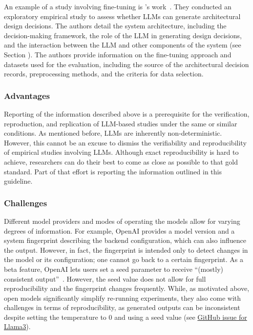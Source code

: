 An example of a study involving fine-tuning is \citeauthor{DBLP:conf/icsa/DharVV24}'s work~\cite{DBLP:conf/icsa/DharVV24}.
They conducted an exploratory empirical study to assess whether LLMs can generate architectural design decisions.
The authors detail the system architecture, including the decision-making framework, the role of the LLM in generating design decisions, and the interaction between the LLM and other components of the system (see Section \toolarchitecture).
The authors provide information on the fine-tuning approach and datasets used for the evaluation, including the source of the architectural decision records, preprocessing methods, and the criteria for data selection. 

\subsubsection{Advantages}

Reporting of the information described above is a prerequisite for the verification, reproduction, and replication of LLM-based studies under the same or similar conditions.
As mentioned before, LLMs are inherently non-deterministic. 
However, this cannot be an excuse to dismiss the verifiability and reproducibility of empirical studies involving LLMs.
Although exact reproducibility is hard to achieve, researchers can do their best to come as close as possible to that gold standard.
Part of that effort is reporting the information outlined in this guideline. 

\subsubsection{Challenges}

Different model providers and modes of operating the models allow for varying degrees of information.
For example, OpenAI provides a model version and a system fingerprint describing the backend configuration, which can also influence the output.
However, in fact, the fingerprint is intended only to detect changes in the model or its configuration; one cannot go back to a certain fingerprint.
As a beta feature, OpenAI lets users set a seed parameter to receive ``(mostly) consistent output''~\cite{OpenAI23}.
However, the seed value does not allow for full reproducibility and the fingerprint changes frequently. 
While, as motivated above, open models significantly simplify re-running experiments, they also come with challenges in terms of reproducibility, as generated outputs can be inconsistent despite setting the temperature to 0 and using a seed value (see \href{https://github.com/ollama/ollama/issues/5321}{GitHub issue for Llama3}).

